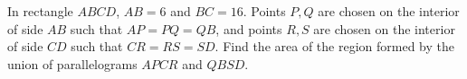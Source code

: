 In rectangle $ABCD$, $AB=6$ and $BC=16$. Points $P, Q$ are chosen on the interior of side $AB$ such that $AP=PQ=QB$, and points $R, S$ are chosen on the interior of side $CD$ such that $CR=RS=SD$. Find the area of the region formed by the union of parallelograms $APCR$ and $QBSD$.
